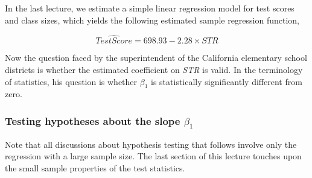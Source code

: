 \documentclass[a4paper,11pt]{article}
\begin{document}
In the last lecture, we estimate a simple linear regression model for test
scores and class sizes, which yields the following estimated sample
regression function,

\begin{equation}
\label{eq:testscr-str-1e}
\widehat{TestScore} = 698.93 - 2.28 \times STR
\end{equation}

Now the question faced by the superintendent of the California
elementary school districts is whether the estimated coefficient on
\emph{STR} is valid. In the terminology of statistics, his question is
whether \(\beta_1\) is statistically significantly different from zero. 

\subsubsection*{Testing hypotheses about the slope \(\beta_1\)}
\label{sec:orgb14957a}

Note that all discussions about hypothesis testing that
follows involve only the regression with a large sample size. The
last section of this lecture touches upon the small sample properties
of the test statistics.
\end{document}
